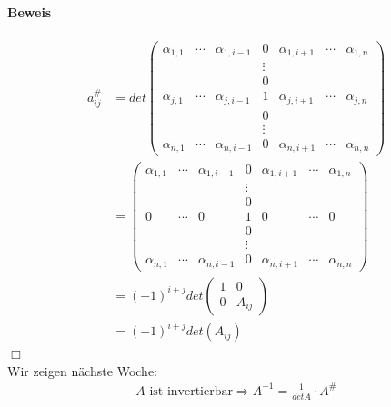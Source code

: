 \documentclass[11pt]{report}
\begin{document}
\paragraph{Beweis}
\begin{align}
a_{ij}^{\#} &= det
\begin{pmatrix}
\alpha_{1,1} & \cdots & \alpha_{1, i-1} & 0 & \alpha_{1, i+1} & \cdots & \alpha_{1,n} \\
             &        &                 & \vdots &            &        &              \\
             &        &                 & 0 &            &        &              \\
\alpha_{j,1} & \cdots & \alpha_{j, i-1} & 1 & \alpha_{j, i+1} & \cdots & \alpha_{j,n} \\
             &        &                 & 0 &            &        &              \\
             &        &                 & \vdots &            &        &              \\
\alpha_{n,1} & \cdots & \alpha_{n, i-1} & 0 & \alpha_{n, i+1} & \cdots & \alpha_{n,n}
\end{pmatrix} \\
&=
\begin{pmatrix}
\alpha_{1,1} & \cdots & \alpha_{1, i-1} & 0 & \alpha_{1, i+1} & \cdots & \alpha_{1,n} \\
             &        &                 & \vdots &            &        &              \\
             &        &                 & 0 &            &        &              \\
0            & \cdots & 0               & 1 & 0               & \cdots & 0            \\
             &        &                 & 0 &            &        &              \\
             &        &                 & \vdots &            &        &              \\
\alpha_{n,1} & \cdots & \alpha_{n, i-1} & 0 & \alpha_{n, i+1} & \cdots & \alpha_{n,n}
\end{pmatrix} \\
&= (-1)^{i+j} det \begin{pmatrix} 1 & 0 \\ 0 & A_{ij}\end{pmatrix} \\
&= (-1)^{i+j} det (A_{ij})
\end{align}
\hspace*{1cm} \hfill $\Box$ \\
Wir zeigen nächste Woche:
\begin{align}
A \text{ ist invertierbar} \Rightarrow A^{-1} = \frac{1}{det A} \cdot A^{\#}
\end{align}
\end{document}
